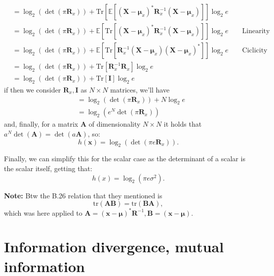 \documentclass[a4paper, 12pt]{book}
\begin{document}
\begin{align}
    &= \log_2(\det(\pi \bm{R}_x)) + \text{Tr}\left[ \mathbb{E}\left[ (\bm{X} - \bm{\mu}_x)^* \bm{R}_x^{-1} (\bm{X} - \bm{\mu}_x) \right] \right] \log_2 e \tag{1.25} \\
    &= \log_2(\det(\pi \bm{R}_x)) + \mathbb{E}\left[ \text{Tr}\left[ (\bm{X} - \bm{\mu}_x)^* \bm{R}_x^{-1} (\bm{X} - \bm{\mu}_x) \right] \right] \log_2 e \qquad \text{Linearity} \nonumber \\
    &= \log_2(\det(\pi \bm{R}_x)) + \mathbb{E}\left[ \text{Tr}\left[ \bm{R}_x^{-1} (\bm{X} - \bm{\mu}_x)(\bm{X} - \bm{\mu}_x)^* \right] \right] \log_2 e \qquad \text{Ciclicity} \nonumber \\
    &= \log_2(\det(\pi \bm{R}_x)) + \text{Tr}\left[ \bm{R}_x^{-1} \bm{R}_x \right] \log_2 e \nonumber \\
    &= \log_2(\det(\pi \bm{R}_x)) + \text{Tr}\left[ \bm{I} \right] \log_2 e \tag{1.28}
\end{align}
if then we consider $\bm{R}_x, \bm{I}$ as $N \times N$ matrices, we'll have
\begin{align*}
    &= \log_2(\det(\pi \bm{R}_x)) + N \log_2 e \\
    &= \log_2(e^N \det(\pi \bm{R}_x))
\end{align*}
and, finally, for a matrix $\bm{A}$ of dimensionality $N \times N$ it holds that $a^N \det(\bm{A}) = \det(a\bm{A})$, so:
\begin{equation}
    h(\bm{x}) = \log_2(\det(\pi e \bm{R}_x)). \tag{1.29}
\end{equation}

Finally, we can simplify this for the scalar case as the determinant of a scalar is the scalar itself, getting that:
\[ h(x) = \log_2(\pi e \sigma^2). \]

\begin{greenbox}
    \textbf{ Note:} Btw the B.26 relation that they mentioned is
    \begin{equation}
        \text{tr}(\bm{AB}) = \text{tr}(\bm{BA}), \tag{B.26}
    \end{equation}
    which was here applied to $\bm{A} = (\bm{x} - \bm{\mu})^* \bm{R}^{-1}, \bm{B} = (\bm{x} - \bm{\mu})$.
\end{greenbox}

\section{Information divergence, mutual information}
\end{document}
